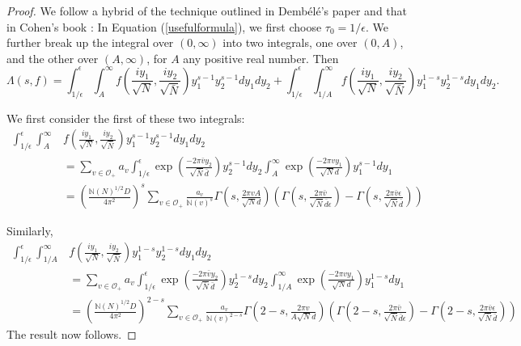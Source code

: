 \documentclass{article}
\theoremstyle{plain}
\begin{document}
\begin{proof}
We follow a hybrid of the technique outlined in Demb\'{e}l\'{e}'s paper \cite{dembele} and that in Cohen's book \cite{cohen}: In Equation (\ref{usefulformula}), we first choose $\tau_0=1/\epsilon$. We further break up the integral over $(0, \infty)$ into two integrals, one over $(0,A)$, and the other over $(A, \infty)$, for $A$ any positive real number. Then 
\begin{equation*}
\Lambda(s,f)=\int_{1/\epsilon}^{\epsilon}\int_{A}^{\infty} f\left(\frac{iy_1}{\sqrt{N}},\frac{iy_2}{\sqrt{\bar{N}}}\right) y_1^{s-1}y_2^{s-1} dy_1 dy_2 + \int_{1/\epsilon}^{\epsilon}\int_{1/A}^{\infty} f\left(\frac{iy_1}{\sqrt{N}},\frac{iy_2}{\sqrt{\bar{N}}}\right) y_1^{1-s}y_2^{1-s} dy_1 dy_2.
\end{equation*}

We first consider the first of these two integrals:
\begin{equation*}
\begin{split}
\int_{1/\epsilon}^{\epsilon}\int_{A}^{\infty} &f\left(\frac{iy_1}{\sqrt{N}},\frac{iy_2}{\sqrt{\bar{N}}}\right) y_1^{s-1}y_2^{s-1} dy_1 dy_2 \\
&= \sum_{v \in \mathcal{O}_+} a_v  \int_{1/\epsilon}^{\epsilon} \exp \left( \frac{ -2\pi\bar{v} y_2}{\sqrt{\bar{N}}\bar{d}}\right) y_2^{s-1} dy_2 \int_{A}^{\infty} \exp\left(  \frac{-2\pi vy_1}{\sqrt{N} d}\right) y_1^{s-1} dy_1\\
&= \left(\frac{\mathbb{N}(N)^{1/2}D}{4\pi^2}\right)^s \sum_{v \in \mathcal{O}_+} \frac{a_v}{\mathbb{N}(v)^s} \Gamma\left(s, \frac{2\pi v A}{\sqrt{N}d}\right) \left(\Gamma\left(s,\frac{2 \pi \bar{v}}{\sqrt{\bar{N}}\bar{d} \epsilon} \right)-  \Gamma\left(s,\frac{2 \pi \bar{v}\epsilon}{\sqrt{\bar{N}}\bar{d} } \right) \right) 
\end{split}
\end{equation*}

Similarly,
\begin{equation*}
\begin{split}
\int_{1/\epsilon}^{\epsilon}\int_{1/A}^{\infty} &f\left(\frac{iy_1}{\sqrt{N}},\frac{iy_2}{\sqrt{\bar{N}}}\right) y_1^{1-s}y_2^{1-s} dy_1 dy_2 \\
&= \sum_{v \in \mathcal{O}_+} a_v  \int_{1/\epsilon}^{\epsilon} \exp \left( \frac{ -2\pi\bar{v} y_2}{\sqrt{\bar{N}}\bar{d}}\right) y_2^{1-s} dy_2 \int_{1/A}^{\infty} \exp\left(  \frac{-2\pi vy_1}{\sqrt{N} d}\right) y_1^{1-s} dy_1\\
&= \left(\frac{\mathbb{N}(N)^{1/2}D}{4\pi^2}\right)^{2-s}\sum_{v \in \mathcal{O}_+} \frac{a_v}{\mathbb{N}(v)^{2-s}} \Gamma\left(2-s, \frac{2\pi v }{A\sqrt{N}d}\right) \left(\Gamma\left(2-s,\frac{2 \pi \bar{v}}{\sqrt{\bar{N}}\bar{d} \epsilon} \right)-  \Gamma\left(2-s,\frac{2 \pi \bar{v}\epsilon}{\sqrt{\bar{N}}\bar{d} } \right) \right) 
\end{split}
\end{equation*}
The result now follows.
\end{proof}
\end{document}
